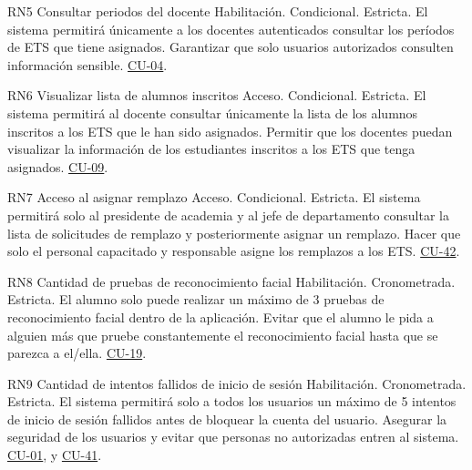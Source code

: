 \begin{BussinesRule}{RN5} {Consultar periodos del docente}
	\BRitem[Tipo:] Habilitación.
	\BRitem[Clase:] Condicional.
	\BRitem[Nivel:] Estricta.
	\BRitem[Descripción:] El sistema permitirá únicamente a los docentes autenticados consultar los períodos de ETS que tiene asignados.
	\BRitem[Motivación:] Garantizar que solo usuarios autorizados consulten información sensible.			
	 \hyperlink{CU-04}{CU-04}.
	\end{BussinesRule}

\begin{BussinesRule}{RN6} {Visualizar lista de alumnos inscritos}
	\BRitem[Tipo:] Acceso.
	\BRitem[Clase:] Condicional.
	\BRitem[Nivel:] Estricta.
	\BRitem[Descripción:] El sistema permitirá al docente consultar únicamente la lista de los alumnos inscritos a los ETS que le han sido asignados.
	\BRitem[Motivación:] Permitir que los docentes puedan visualizar la información de los estudiantes inscritos a los ETS que tenga asignados.
	 \hyperlink{CU-09}{CU-09}.
	\end{BussinesRule}

\begin{BussinesRule}{RN7} {Acceso al asignar remplazo}
    \BRitem[Tipo:] Acceso.
    \BRitem[Clase:] Condicional.
    \BRitem[Nivel:] Estricta.
    \BRitem[Descripción:] El sistema permitirá solo al presidente de academia  y al jefe de departamento consultar la lista de solicitudes de remplazo y posteriormente asignar un remplazo.
    \BRitem[Motivación:] Hacer que solo el personal capacitado y responsable asigne los remplazos a los ETS.
     \hyperlink{CU-42}{CU-42}.
    \end{BussinesRule}

\begin{BussinesRule}{RN8} {Cantidad de pruebas de reconocimiento facial}
    \BRitem[Tipo:]Habilitación.
    \BRitem[Clase:]Cronometrada.
    \BRitem[Nivel:] Estricta.
    \BRitem[Descripción:] El alumno solo puede realizar un máximo de 3 pruebas de reconocimiento facial dentro de la aplicación.
    \BRitem[Motivación:] Evitar que el alumno le pida a alguien más que  pruebe constantemente el reconocimiento facial hasta que se parezca a el/ella.
     \hyperlink{CU-19}{CU-19}.
    \end{BussinesRule}

\begin{BussinesRule}{RN9} {Cantidad de intentos fallidos de inicio de sesión}
    \BRitem[Tipo:]Habilitación.
    \BRitem[Clase:] Cronometrada.
    \BRitem[Nivel:] Estricta.
    \BRitem[Descripción:] El sistema permitirá solo a todos los usuarios un máximo de 5 intentos de inicio de sesión fallidos antes de bloquear la cuenta del usuario.
    \BRitem[Motivación:] Asegurar la seguridad de los usuarios y evitar que personas no autorizadas entren al sistema.
     \hyperlink{CU-01}{CU-01}, y \hyperlink{CU-41}{CU-41}.
    \end{BussinesRule}

